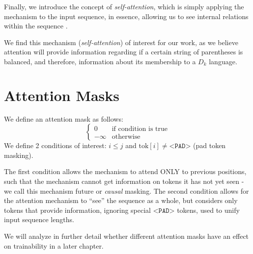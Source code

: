 Finally, we introduce the concept of \emph{self-attention}, which is simply applying the mechanism to the input sequence, in essence, allowing us to see internal relations within the sequence \cite{attention_is_all_you_need}.

We find this mechanism (\emph{self-attention}) of interest for our work, as we believe attention will provide information regarding if a certain string of parentheses is balanced, and therefore, information about its membership to a $D_k$ language.

\section{Attention Masks}
We define an attention mask as follows:
\begin{equation}
    \begin{cases}
         0 & \text{if condition is true}  \\
         -\infty & \text{otherwise}
    \end{cases}
\end{equation}
We define 2 conditions of interest: $i\leq j$ and $\text{tok}[i] \neq \texttt{<PAD>}$ (pad token masking).

The first condition allows the mechanism to attend ONLY to previous positions, such that the mechanism cannot get information on tokens it has not yet seen - we call this mechanism future or \emph{causal} masking.
The second condition allows for the attention mechanism to ``see'' the sequence as a whole, but considers only tokens that provide information, ignoring special $\texttt{<PAD>}$ tokens, used to unify input sequence lengths.

We will analyze in further detail whether different attention masks have an effect on trainability in a later chapter.

